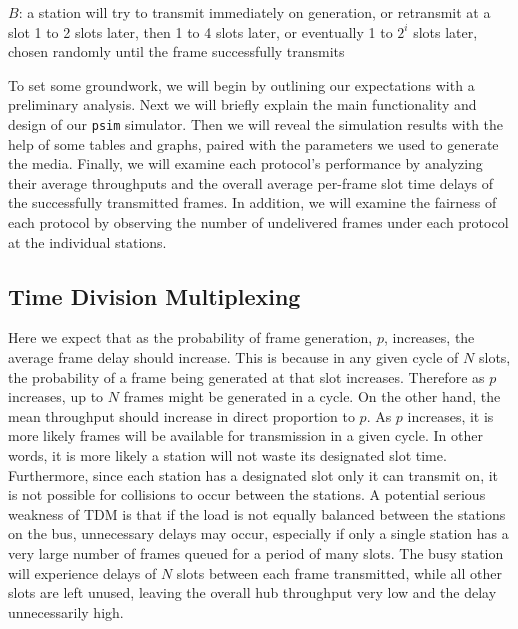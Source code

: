 \documentclass[twocolumn]{article}
\begin{document}
$B$: a station will try to transmit immediately on generation, or retransmit at
a slot 1 to 2 slots later, then 1 to 4 slots later, or eventually 1 to $2^i$
slots later, chosen randomly until the frame successfully transmits

	To set some groundwork, we will begin by outlining our expectations with
	a preliminary analysis. Next we will briefly explain the main
	functionality and design of our \verb|psim| simulator. Then we will reveal the
	simulation results with the help of some tables and graphs, paired with
	the parameters we used to generate the media. Finally, we will examine
	each protocol's performance by analyzing their average throughputs and
	the overall average per-frame slot time delays of the successfully
	transmitted frames. In addition, we will examine the fairness of each
	protocol by observing the number of undelivered frames under each
	protocol at the individual stations.

\subsection*{Time Division Multiplexing} Here we expect that as the probability
of frame generation, $p$, increases, the average frame delay should increase. This is
because in any given cycle of $N$ slots, the probability of a frame being
generated at that slot increases. Therefore as $p$ increases, up to $N$ frames
might be generated in a cycle.  On the other hand, the mean throughput should
increase in direct proportion to $p$. As $p$ increases, it is more likely frames
will be available for transmission in a given cycle. In other words, it is more
likely a station will not waste its designated slot time. Furthermore, since
each station has a designated slot only it can transmit on, it is not possible
for collisions to occur between the stations. 
A potential serious weakness of TDM is that if the load is not equally balanced 
between the stations on the bus, unnecessary delays may occur, especially if only
a single station has a very large number of frames queued for a period of many slots.
The busy station will experience delays of $N$ slots between each frame transmitted,
while all other slots are left unused, leaving the overall hub throughput very low and
the delay unnecessarily high.
\end{document}
